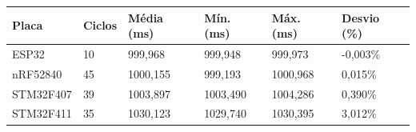 \begin{tabular}{llllll}
\hline
Placa & Ciclos & Média (ms) & Mín. (ms) & Máx. (ms) & Desvio (\%) \\
\hline
ESP32 & 10 & 999,968 & 999,948 & 999,973 & -0,003\% \\
nRF52840 & 45 & 1000,155 & 999,193 & 1000,968 & 0,015\% \\
STM32F407 & 39 & 1003,897 & 1003,490 & 1004,286 & 0,390\% \\
STM32F411 & 35 & 1030,123 & 1029,740 & 1030,395 & 3,012\% \\
\hline
\end{tabular}
